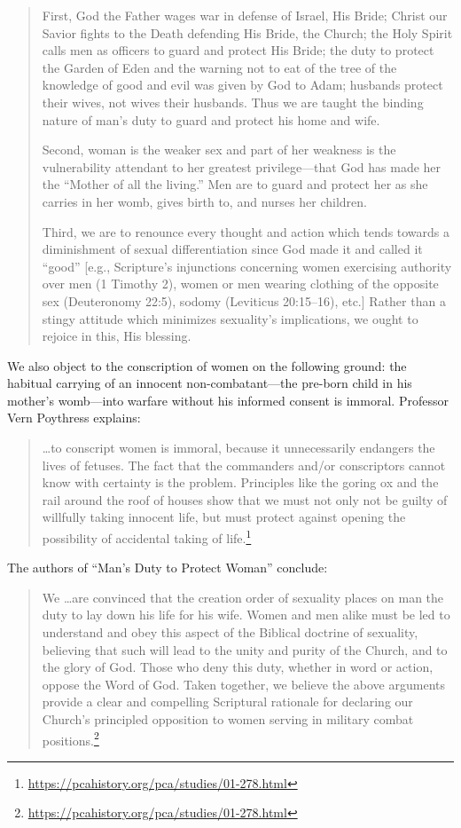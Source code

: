 \documentclass[
]{book}
\begin{document}
\begin{quote}
First, God the Father wages war in defense of Israel, His Bride; Christ our Savior fights to the Death defending His Bride, the Church; the Holy Spirit calls men as officers to guard and protect His Bride; the duty to protect the Garden of Eden and the warning not to eat of the tree of the knowledge of good and evil was given by God to Adam; husbands protect their wives, not wives their husbands. Thus we are taught the binding nature of man's duty to guard and protect his home and wife.

Second, woman is the weaker sex and part of her weakness is the vulnerability attendant to her greatest privilege---that God has made her the ``Mother of all the living.'' Men are to guard and protect her as she carries in her womb, gives birth to, and nurses her children.

Third, we are to renounce every thought and action which tends towards a diminishment of sexual differentiation since God made it and called it ``good'' {[}e.g., Scripture's injunctions concerning women exercising authority over men (1 Timothy 2), women or men wearing clothing of the opposite sex (Deuteronomy 22:5), sodomy (Leviticus 20:15--16), etc.{]} Rather than a stingy attitude which minimizes sexuality's implications, we ought to rejoice in this, His blessing.
\end{quote}

We also object to the conscription of women on the following ground: the habitual carrying of an innocent non-combatant---the pre-born child in his mother's womb---into warfare without his informed consent is immoral. Professor Vern Poythress explains:

\begin{quote}
\ldots to conscript women is immoral, because it unnecessarily endangers the lives of fetuses. The fact that the commanders and/or conscriptors cannot know with certainty is the problem. Principles like the goring ox and the rail around the roof of houses show that we must not only not be guilty of willfully taking innocent life, but must protect against opening the possibility of accidental taking of life.\footnote{\url{https://pcahistory.org/pca/studies/01-278.html}}
\end{quote}

The authors of ``Man's Duty to Protect Woman'' conclude:

\begin{quote}
We \ldots are convinced that the creation order of sexuality places on man the duty to lay down his life for his wife. Women and men alike must be led to understand and obey this aspect of the Biblical doctrine of sexuality, believing that such will lead to the unity and purity of the Church, and to the glory of God. Those who deny this duty, whether in word or action, oppose the Word of God. Taken together, we believe the above arguments provide a clear and compelling Scriptural rationale for declaring our Church's principled opposition to women serving in military combat positions.\footnote{\url{https://pcahistory.org/pca/studies/01-278.html}}
\end{quote}
\end{document}
